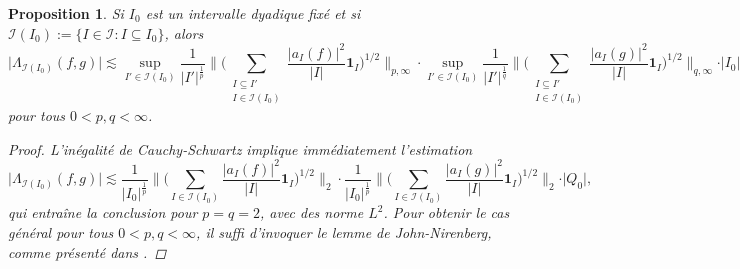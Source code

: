 \documentclass[11pt]{amsart}
\newtheorem{proposition}[theorem]{Proposition}
\newcommand{\one}{\mathbf{1}}
\newcommand{\ii}{\mathscr}
\begin{document}
\begin{proposition}
\label{prop:localization}
Si $I_0$ est un intervalle dyadique fix\'e et si  $\ii I(I_0):=\lbrace I \in \ii I : I \subseteq I_0  \rbrace$, alors
{\fontsize{10.5}{10}
\[
\big| \Lambda_{\ii I\left( I_0 \right)}(f,g) \big| \lesssim \sup_{I' \in \ii I \left( I_0 \right)} \frac{1}{\vert I' \vert^{\frac{1}{p}}} \big\|  \Big( \sum_{\substack{I \subseteq I' \\ I \in \ii I(I_0)}}  \frac{\vert a_I(f) \vert^2}{\vert I \vert}  \one_I \Big)^{1/2}   \big\|_{p, \infty} \cdot  \sup_{I' \in \ii I \left( I_0 \right)} \frac{1}{\vert I' \vert^{\frac{1}{q}}} \big\|  \Big( \sum_{\substack{I \subseteq I' \\ I \in \ii I(I_0)}}  \frac{\vert a_I(g) \vert^2}{\vert I \vert}  \one_I \Big)^{1/2} \big\|_{q, \infty} \cdot \vert I_0  \vert
\]}
pour tous $0<p, q <\infty$. 
\begin{proof}
L'in\'egalit\'e de Cauchy-Schwartz implique imm\'ediatement l'estimation 
\[
\big| \Lambda_{\ii I\left( I_0 \right)}(f,g) \big| \lesssim \frac{1}{\vert I_0 \vert^{\frac{1}{p}}} \big\|  \Big( \sum_{ I \in \ii I(I_0)}  \frac{\vert a_I(f) \vert^2}{\vert I \vert}  \one_I \Big)^{1/2}   \big\|_{2} \cdot \frac{1}{\vert I_0\vert^{\frac{1}{p}}} \big\|  \Big( \sum_{ I \in \ii I(I_0)}  \frac{\vert a_I(g) \vert^2}{\vert I \vert}  \one_I \Big)^{1/2}   \big\|_{2} \cdot \vert Q_0 \vert,
\]
qui entra\^ine la conclusion pour $p=q=2$, avec des norme $L^2$. Pour obtenir le cas g\'en\'eral pour tous $0<p, q <\infty$, il suffi d'invoquer le lemme de John-Nirenberg, comme pr\'esent\'e dans \cite[Section 2.6]{multilinear_harmonic}.
\end{proof}
\end{proposition}
\end{document}
